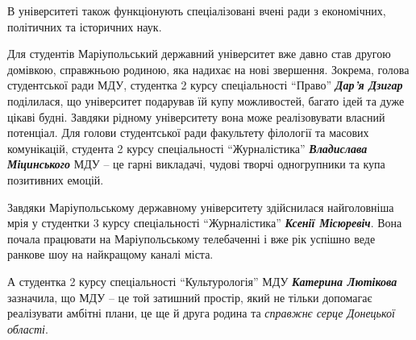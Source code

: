 В університеті також функціонують спеціалізовані вчені ради з економічних,
політичних та історичних наук.


Для студентів Маріупольський державний університет вже давно став другою
домівкою, справжньою родиною, яка надихає на нові звершення. Зокрема, голова
студентської ради МДУ, студентка 2 курсу спеціальності \enquote{Право} \emph{\textbf{Дар'я Дзигар}}
поділилася, що університет подарував їй купу можливостей, багато ідей та дуже
цікаві будні. Завдяки рідному університету вона може реалізовувати власний
потенціал. Для голови студентської ради факультету філології та масових
комунікацій, студента 2 курсу спеціальності \enquote{Журналістика} \emph{\textbf{Владислава
Міцинського}} МДУ – це гарні викладачі, чудові творчі одногрупники та купа
позитивних емоцій.


Завдяки Маріупольському державному університету здійснилася найголовніша мрія у
студентки 3 курсу спеціальності \enquote{Журналістика} \emph{\textbf{Ксенії Місюревіч}}. Вона почала
працювати на Маріупольському телебаченні і вже рік успішно веде ранкове шоу на
найкращому каналі міста.

А студентка 2 курсу спеціальності \enquote{Культурологія} МДУ \emph{\textbf{Катерина Лютікова}}
зазначила, що МДУ – це той затишний  простір, який не тільки  допомагає
реалізувати амбітні плани, це ще й друга родина та \emph{справжнє серце Донецької
області}.

